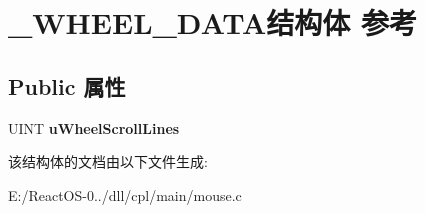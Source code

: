 \hypertarget{struct___w_h_e_e_l___d_a_t_a}{}\section{\+\_\+\+W\+H\+E\+E\+L\+\_\+\+D\+A\+T\+A结构体 参考}
\label{struct___w_h_e_e_l___d_a_t_a}
\subsection*{Public 属性}
\begin{DoxyCompactItemize}
\item 
\mbox{\label{struct___w_h_e_e_l___d_a_t_a_a93f1d9301c185f37063f681422a4cce5}} 
U\+I\+NT {\bfseries u\+Wheel\+Scroll\+Lines}
\end{DoxyCompactItemize}


该结构体的文档由以下文件生成\+:\begin{DoxyCompactItemize}
\item 
E\+:/\+React\+O\+S-\/0../dll/cpl/main/mouse.\+c\end{DoxyCompactItemize}
